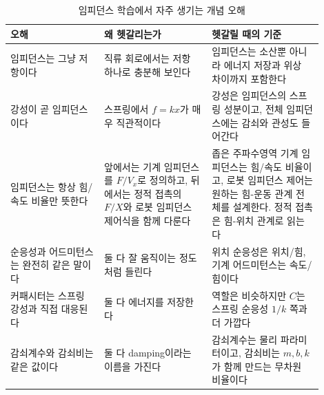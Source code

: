 \begin{table}[!htbp]
  \centering
  \caption{임피던스 학습에서 자주 생기는 개념 오해}
  \label{tab:discussion-concept-misunderstandings}
  {\renewcommand{\arraystretch}{1.12}
  \begin{tabular}{>{\raggedright\arraybackslash}p{0.27\linewidth}>{\raggedright\arraybackslash}p{0.31\linewidth}>{\raggedright\arraybackslash}p{0.32\linewidth}}
    \toprule
    오해 & 왜 헷갈리는가 & 헷갈릴 때의 기준 \\
    \midrule
    임피던스는 그냥 저항이다 & 직류 회로에서는 저항 하나로 충분해 보인다 & 임피던스는 소산뿐 아니라 에너지 저장과 위상 차이까지 포함한다 \\
    강성이 곧 임피던스이다 & 스프링에서 $f=kx$가 매우 직관적이다 & 강성은 임피던스의 스프링 성분이고, 전체 임피던스에는 감쇠와 관성도 들어간다 \\
    임피던스는 항상 힘/속도 비율만 뜻한다 & 앞에서는 기계 임피던스를 $F/V_x$로 정의하고, 뒤에서는 정적 접촉의 $F/X$와 로봇 임피던스 제어식을 함께 다룬다 & 좁은 주파수영역 기계 임피던스는 힘/속도 비율이고, 로봇 임피던스 제어는 원하는 힘-운동 관계 전체를 설계한다. 정적 접촉은 힘-위치 관계로 읽는다 \\
    순응성과 어드미턴스는 완전히 같은 말이다 & 둘 다 잘 움직이는 정도처럼 들린다 & 위치 순응성은 위치/힘, 기계 어드미턴스는 속도/힘이다 \\
    커패시터는 스프링 강성과 직접 대응된다 & 둘 다 에너지를 저장한다 & 역할은 비슷하지만 $C$는 스프링 순응성 $1/k$ 쪽과 더 가깝다 \\
    감쇠계수와 감쇠비는 같은 값이다 & 둘 다 damping이라는 이름을 가진다 & 감쇠계수는 물리 파라미터이고, 감쇠비는 $m,b,k$가 함께 만드는 무차원 비율이다 \\
    \bottomrule
  \end{tabular}}
\end{table}

